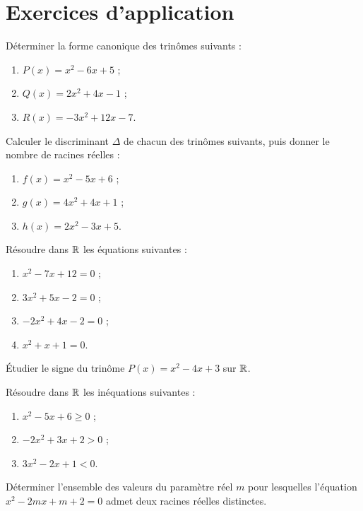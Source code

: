 \section{Exercices d'application}


\exo{}
Déterminer la forme canonique des trinômes suivants :
\begin{enumerate}[label=\alph*)]
  \item $P(x) = x^2 - 6x + 5$ ;
  \item $Q(x) = 2x^2 + 4x - 1$ ;
  \item $R(x) = -3x^2 + 12x - 7$.
\end{enumerate}

\exo{}
Calculer le discriminant $\Delta$ de chacun des trinômes suivants, puis donner le nombre de racines réelles :
\begin{enumerate}[label=\alph*)]
  \item $f(x) = x^2 - 5x + 6$ ;
  \item $g(x) = 4x^2 + 4x + 1$ ;
  \item $h(x) = 2x^2 - 3x + 5$.
\end{enumerate}

\exo{}
Résoudre dans $\mathbb{R}$ les équations suivantes :
\begin{enumerate}[label=\alph*)]
  \item $x^2 - 7x + 12 = 0$ ;
  \item $3x^2 + 5x - 2 = 0$ ;
  \item $-2x^2 + 4x - 2 = 0$ ;
  \item $x^2 + x + 1 = 0$.
\end{enumerate}


\exo{}
Étudier le signe du trinôme $P(x) = x^2 - 4x + 3$ sur $\mathbb{R}$.

\exo{}
Résoudre dans $\mathbb{R}$ les inéquations suivantes :
\begin{enumerate}[label=\alph*)]
  \item $x^2 - 5x + 6 \geq 0$ ;
  \item $-2x^2 + 3x + 2 > 0$ ;
  \item $3x^2 - 2x + 1 < 0$.
\end{enumerate}

\exo{}
Déterminer l'ensemble des valeurs du paramètre réel $m$ pour lesquelles l'équation $x^2 - 2mx + m + 2 = 0$ admet deux racines réelles distinctes.

